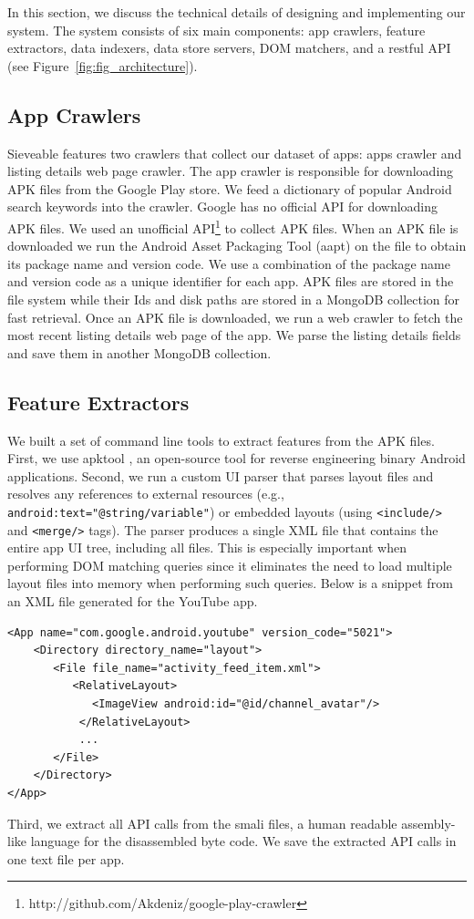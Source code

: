 In this section, we discuss the technical details of designing and implementing our system. The system consists of six main components: app crawlers, feature extractors, data indexers, data store servers, DOM matchers, and a restful API (see Figure~\ref{fig:fig_architecture}).

\subsection{App Crawlers}
Sieveable features two crawlers that collect our dataset of apps: apps crawler and listing details web page crawler.
The app crawler is responsible for downloading APK files from the Google Play store.
We feed a dictionary of popular Android search keywords into the crawler.
Google has no official API for downloading APK files.
We used an unofficial API\footnote{http://github.com/Akdeniz/google-play-crawler} to collect APK files.
When an APK file is downloaded we run the Android Asset Packaging Tool (aapt) on the file to obtain its package name and version code.
We use a combination of the package name and version code as a unique identifier for each app.
APK files are stored in the file system while their Ids and disk paths are stored in a MongoDB collection for fast retrieval.
Once an APK file is downloaded, we run a web crawler to fetch the most recent listing details web page of the app.
We parse the listing details fields and save them in another MongoDB collection.

\subsection{Feature Extractors}
We built a set of command line tools to extract features from the APK files.
First, we use apktool \cite{apktool}, an open-source tool for reverse engineering binary Android applications.
Second, we run a custom UI parser that parses layout files and resolves any references to external resources (e.g., \texttt{android:text="@string/variable"}) or embedded layouts (using \texttt{<include/>} and \texttt{<merge/>} tags).
The parser produces a single XML file that contains the entire app UI tree, including all files.
This is especially important when performing DOM matching queries since it eliminates the need to load multiple layout files into memory when performing such queries.
Below is a snippet from an XML file generated for the YouTube app.

\begin{verbatim}
<App name="com.google.android.youtube" version_code="5021">
    <Directory directory_name="layout">
       <File file_name="activity_feed_item.xml">
          <RelativeLayout>
             <ImageView android:id="@id/channel_avatar"/>
           </RelativeLayout>
           ...
       </File>
    </Directory>
</App>
\end{verbatim}
Third, we extract all API calls from the smali files, a human readable assembly-like language for the disassembled byte code.
We save the extracted API calls in one text file per app.

